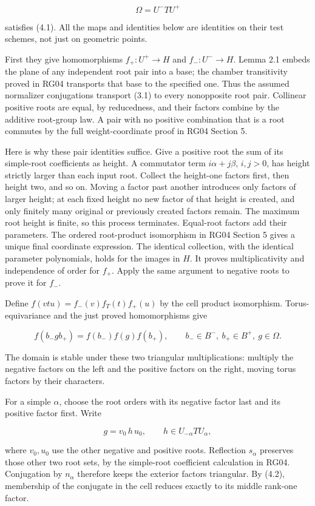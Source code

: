 \documentclass[11pt,a4paper,openany]{report}
\begin{document}
\[
\Omega=U^-TU^+
\]

satisfies (4.1). All the maps and identities below are identities on their test schemes, not just on geometric points.

First they give homomorphisms \(f_+:U^+\to H\) and \(f_-:U^-\to H\). Lemma 2.1 embeds the plane of any independent root pair into a base; the chamber transitivity proved in RG04 transports that base to the specified one. Thus the assumed normalizer conjugations transport (3.1) to every nonopposite root pair. Collinear positive roots are equal, by reducedness, and their factors combine by the additive root-group law. A pair with no positive combination that is a root commutes by the full weight-coordinate proof in RG04 Section 5.

Here is why these pair identities suffice. Give a positive root the sum of its simple-root coefficients as height. A commutator term \(i\alpha+j\beta\), \(i,j>0\), has height strictly larger than each input root. Collect the height-one factors first, then height two, and so on. Moving a factor past another introduces only factors of larger height; at each fixed height no new factor of that height is created, and only finitely many original or previously created factors remain. The maximum root height is finite, so this process terminates. Equal-root factors add their parameters. The ordered root-product isomorphism in RG04 Section 5 gives a unique final coordinate expression. The identical collection, with the identical parameter polynomials, holds for the images in \(H\). It proves multiplicativity and independence of order for \(f_+\). Apply the same argument to negative roots to prove it for \(f_-\).

Define \(f(vtu)=f_-(v)f_T(t)f_+(u)\) by the cell product isomorphism. Torus-equivariance and the just proved homomorphisms give

\[
f(b_-gb_+)=f(b_-)f(g)f(b_+),
\qquad b_-\in B^-,\ b_+\in B^+,\ g\in\Omega.
\tag{4.2}
\]

The domain is stable under these two triangular multiplications: multiply the negative factors on the left and the positive factors on the right, moving torus factors by their characters.

For a simple \(\alpha\), choose the root orders with its negative factor last and its positive factor first. Write

\[
g=v_0\,h\,u_0,\qquad h\in U_{-\alpha}TU_\alpha,
\]

where \(v_0,u_0\) use the other negative and positive roots. Reflection \(s_\alpha\) preserves those other two root sets, by the simple-root coefficient calculation in RG04. Conjugation by \(n_\alpha\) therefore keeps the exterior factors triangular. By (4.2), membership of the conjugate in the cell reduces exactly to its middle rank-one factor.
\end{document}
